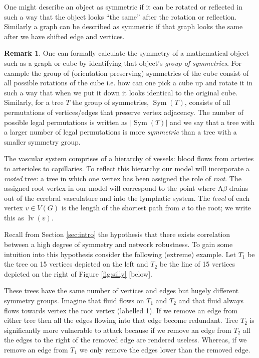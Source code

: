 \documentclass[10pt]{amsart} %
\theoremstyle{definition}
\newtheorem*{rem}{Remark}
\DeclareMathOperator{\Sym}{Sym}
\DeclareMathOperator{\lv}{lv}
\begin{document}
One might describe an object as symmetric if it can be rotated or reflected in such a way that the object looks ``the same'' after the rotation or reflection.  Similarly a graph can be described as symmetric if that graph looks the same after we have shifted edge and vertices.    

\begin{rem}
One can formally calculate the symmetry of a mathematical object such as a graph or cube by identifying that object's \emph{group of symmetries}.  For example the group of (orientation preserving) symmetries of the cube consist of all possible rotations of the cube i.e. how can one pick a cube up and rotate it in such a way that when we put it down it looks identical to the original cube.  Similarly, for a tree $T$ the group of symmetries, $\Sym(T)$, consists of all permutations of vertices/edges that preserve vertex adjacency. The number of possible legal permutations is written as $\lvert\Sym(T)\rvert$ and we say that a tree with a larger number of legal permutations is more \emph{symmetric} than a tree with a smaller symmetry group.  
\end{rem}

The vascular system comprises of a hierarchy of vessels: blood flows from arteries to arterioles to capillaries.  To reflect this hierarchy our model will incorporate a \emph{rooted} tree: a tree in which one vertex has been assigned the role of \emph{root}.  The assigned root vertex in our model will correspond to the point where A$\beta$ drains out of the cerebral vasculature and into the lymphatic system. The \emph{level} of each vertex $v \in V(G)$ is the length of the shortest path from $v$ to the root; we write this as $\lv(v)$.


Recall from Section \ref{sec:intro} the hypothesis that there exists correlation between a high degree of symmetry and network robustness. To gain some intuition into this hypothesis consider the following (extreme) example.  Let $T_1$ be the tree on 15 vertices depicted on the left and $T_{2}$ be the line of 15 vertices depicted on the right of Figure \ref{fig:silly} [below].

These trees have the same number of vertices and edges but hugely different symmetry groups.  Imagine that fluid flows on $T_1$ and $T_2$ and that fluid always flows towards vertex the root vertex (labelled 1).  If we remove an edge from either tree then all the edges flowing into that edge become redundant.  Tree $T_2$ is significantly more vulnerable to attack because if we remove an edge from $T_2$ all the edges to the right of the removed edge are rendered useless.  Whereas, if we remove an edge from $T_1$ we only remove the edges lower than the removed edge.
\end{document}
